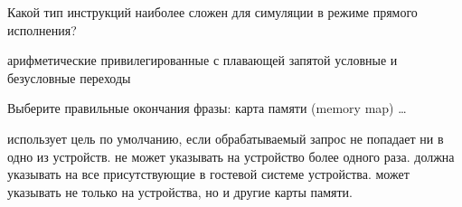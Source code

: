 \documentclass[a4paper, addpoints, answers]{exam}
\begin{document}
\begin{questions}




\question[1] Какой тип инструкций наиболее сложен для симуляции в режиме прямого исполнения?
\begin{choices}
    \choice арифметические
    \correctchoice привилегированные
    \choice с плавающей запятой
    \choice условные и безусловные переходы
\end{choices}

% 


\question[1] Выберите правильные окончания фразы: карта памяти (memory map) \dots
\begin{choices}
 	\correctchoice использует цель по умолчанию, если обрабатываемый запрос не попадает ни в одно из устройств.
 	\choice не может указывать на устройство более одного раза.
 	\choice должна указывать на все присутствующие в гостевой системе устройства.
 	\correctchoice может указывать не только на устройства, но и другие карты памяти.
\end{choices}



\end{questions}
\end{document}
